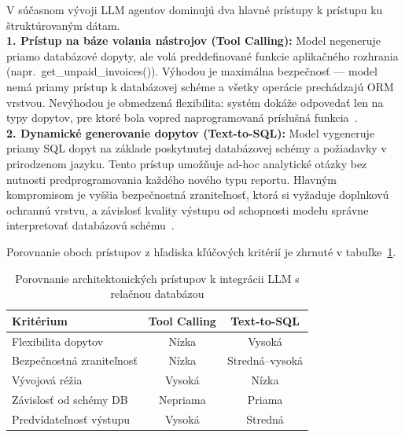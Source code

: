 V súčasnom vývoji LLM agentov dominujú dva hlavné prístupy k prístupu ku
štruktúrovaným dátam. \\

\textbf{1. Prístup na báze volania nástrojov (Tool Calling):} Model negeneruje priamo
databázové dopyty, ale volá preddefinované funkcie aplikačného rozhrania \\ (napr.\ get\_unpaid\_invoices()).
Výhodou je maximálna bezpečnosť — model nemá priamy prístup k databázovej schéme
a všetky operácie prechádzajú ORM vrstvou. Nevýhodou je obmedzená flexibilita:
systém dokáže odpovedať len na typy dopytov, pre ktoré bola vopred naprogramovaná
príslušná funkcia~\cite{atkinson2025}. \\

\textbf{2. Dynamické generovanie dopytov (Text-to-SQL):} Model vygeneruje priamy
SQL dopyt na základe poskytnutej databázovej schémy a požiadavky v prirodzenom
jazyku. Tento prístup umožňuje ad-hoc analytické otázky bez nutnosti predprogramovania
každého nového typu reportu. Hlavným kompromisom je vyššia bezpečnostná
zraniteľnosť, ktorá si vyžaduje doplnkovú ochrannú vrstvu, a závislosť kvality
výstupu od schopnosti modelu správne interpretovať databázovú schému~\cite{rajkumar2022texttosql,
katsogiannis2023texttosqlsurvey}. %

Porovnanie oboch prístupov z hľadiska kľúčových kritérií je zhrnuté v tabuľke~\ref{tab:db-pristupy}.

\begin{table}[htbp]
	\centering
	\caption{Porovnanie architektonických prístupov k integrácii LLM s relačnou
	databázou}
	\label{tab:db-pristupy}
	\begin{tabular}{|l|c|c|}
		\hline
		\textbf{Kritérium}        & \textbf{Tool Calling} & \textbf{Text-to-SQL} \\
		\hline
		Flexibilita dopytov       & Nízka                 & Vysoká               \\
		Bezpečnostná zraniteľnosť & Nízka                 & Stredná–vysoká       \\
		Vývojová réžia            & Vysoká                & Nízka                \\
		Závislosť od schémy DB    & Nepriama              & Priama               \\
		Predvídateľnosť výstupu   & Vysoká                & Stredná              \\
		\hline
	\end{tabular}
\end{table}

